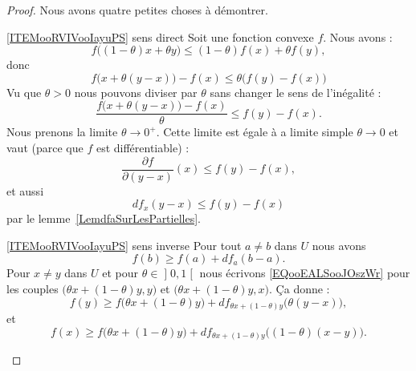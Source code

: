 \begin{proof}
    Nous avons quatre petites choses à démontrer.
    \begin{subproof}
    \item[\ref{ITEMooRVIVooIayuPS} sens direct]
        Soit une fonction convexe \( f\). Nous avons :
        \begin{equation}
            f\big( (1-\theta)x+\theta y \big)\leq (1-\theta)f(x)+\theta f(y),
        \end{equation}
        donc
        \begin{equation}
            f\big( x+\theta(y-x) \big)-f(x)\leq \theta\big( f(y)-f(x) \big)
        \end{equation}
        Vu que \( \theta>0\) nous pouvons diviser par \( \theta\) sans changer le sens de l'inégalité :
        \begin{equation}        \label{EQooAXXFooHWtiJh}
            \frac{ f\big( x+\theta(y-x) \big)-f(x) }{ \theta }\leq f(y)-f(x).
        \end{equation}
        Nous prenons la limite \( \theta\to 0^+\). Cette limite est égale à a limite simple \( \theta\to 0\) et vaut (parce que \( f\) est différentiable) :
        \begin{equation}
            \frac{ \partial f }{ \partial (y-x) }(x)\leq f(y)-f(x),
        \end{equation}
        et aussi
        \begin{equation}
            df_x(y-x)\leq f(y)-f(x)
        \end{equation}
        par le lemme~\ref{LemdfaSurLesPartielles}.
    \item[\ref{ITEMooRVIVooIayuPS} sens inverse]
        Pour tout \( a\neq b\) dans \( U\) nous avons
        \begin{equation}        \label{EQooEALSooJOszWr}
            f(b)\geq f(a)+df_a(b-a).
        \end{equation}
    Pour \( x\neq y\) dans \( U\) et pour \( \theta\in\mathopen] 0 , 1 \mathclose[\) nous écrivons \eqref{EQooEALSooJOszWr} pour les couples \( \big( \theta x+(1-\theta)y,y \big)\) et \( \big( \theta x+(1-\theta)y,x \big)\). Ça donne :
        \begin{equation}
            f(y)\geq f\big( \theta x+(1-\theta)y \big)+df_{\theta x+(1-\theta)y}\big( \theta(y-x) \big),
        \end{equation}
        et
        \begin{equation}
            f(x)\geq f\big( \theta x+(1-\theta)y \big)+df_{\theta x+(1-\theta)y}\big( (1-\theta)(x-y) \big).

\end{equation}
\end{subproof}
\end{proof}
